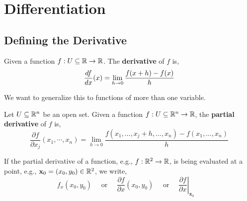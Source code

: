 \section{Differentiation}
\subsection{Defining the Derivative}
Given a function $f: U \subseteq \mathbb{R} \rightarrow \mathbb{R}$. The \textbf{derivative} of $f$ is,
\[
\frac{d f}{d x}(x) =\lim _{h \rightarrow 0} \frac{f(x+h)-f(x)}{h}
\]

\noindent We want to generalize this to functions of more than one variable.

\begin{defn}
    \sloppy Let $U \subseteq \mathbb{R}^n$ be an open set. Given a function $f: U \subseteq \mathbb{R}^n \rightarrow \mathbb{R}$, the \textbf{partial derivative} of $f$ is,
    \[\frac{\partial f}{\partial x_j}(x_1, \cdots, x_n) =\lim _{h \rightarrow 0} \frac{f\left(x_1, \ldots, x_j+h, \ldots, x_n\right)-f\left(x_1, \ldots, x_n\right)}{h}\]
\end{defn}

\begin{rmk}
If the partial derivative of a function, e.g., $f: \mathbb{R}^2 \rightarrow \mathbb{R}$, is being evaluated at a point, e.g., $\mathbf{x}_0 = (x_0, y_0) \in \mathbb{R}^2$, we write,
\[
f_x(x_0, y_0) \quad \text{ or } \quad
\frac{\partial f}{\partial x}\left(x_0, y_0\right) \quad \text { or }\left.\quad \frac{\partial f}{\partial x}\right|_{\mathbf{x}_0} \quad\]
\end{rmk}

